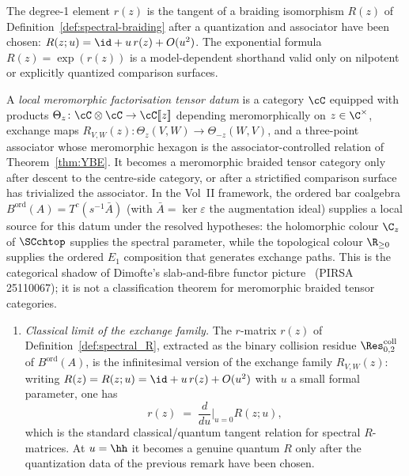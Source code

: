 \begin{remark}
The degree-1 element $r(z)$ is the tangent of a braiding isomorphism
$R(z)$ of Definition~\ref{def:spectral-braiding} after a quantization
and associator have been chosen:
$R(z;u)=\id+u\,r(z)+O(u^2)$. The exponential formula
$R(z)=\exp(r(z))$ is a model-dependent shorthand valid only on
nilpotent or explicitly quantized comparison surfaces.
\end{remark}

\begin{remark}
\label{rem:dimofte-meromorphic-braided}
A \emph{local meromorphic factorisation tensor datum} is a category
$\cC$ equipped with products
$\Theta_z\colon\cC\otimes\cC\to\cC[\![z]\!]$ depending
meromorphically on \(z\in\C^\times\), exchange maps
$R_{V,W}(z)\colon\Theta_z(V,W)\to\Theta_{-z}(W,V)$, and a
three-point associator whose meromorphic hexagon is the
associator-controlled relation of Theorem~\ref{thm:YBE}.  It becomes a
meromorphic braided tensor category only after descent to the
centre-side category, or after a strictified comparison surface has
trivialized the associator. In the Vol~II framework, the ordered bar
coalgebra $B^{\mathrm{ord}}(A)=T^c(s^{-1}\bar A)$ (with
$\bar A=\ker\varepsilon$ the augmentation ideal) supplies a local
source for this datum under the resolved hypotheses: the holomorphic
colour $\C_z$ of $\SCchtop$ supplies the spectral parameter, while the
topological colour $\R_{\geq 0}$ supplies the ordered \(E_1\)
composition that generates exchange paths. This is the categorical
shadow of Dimofte's slab-and-fibre functor picture~\cite{Dimofte25}
(PIRSA 25110067); it is not a classification theorem for meromorphic
braided tensor categories.
\begin{enumerate}[label=\textup{(\roman*)}]
\item \emph{Classical limit of the exchange family.} The $r$-matrix
$r(z)$ of Definition~\ref{def:spectral_R}, extracted as the binary
collision residue $\Res^{\mathrm{coll}}_{0,2}$ of
$B^{\mathrm{ord}}(A)$, is the infinitesimal version of the exchange
family $R_{V,W}(z)$: writing $R(z)=R(z;u)=\id+u\,r(z)+O(u^2)$ with
$u$ a small formal parameter, one has
\[
r(z) \;=\; \frac{d}{du}\bigg|_{u=0} R(z;u),
\]
which is the standard classical/quantum tangent relation for spectral
$R$-matrices. At $u=\hh$ it becomes a genuine quantum $R$ only after
the quantization data of the previous remark have been chosen.

\end{enumerate}
\end{remark}

